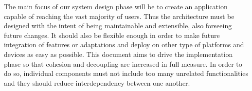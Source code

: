 The main focus of our system design phase will be to create an application capable of reaching the vast majority of users. Thus the architecture must be designed with the intent of being maintainable and extensible, also forseeing future changes.
It should also be flexible enough in order to make future integration of features or adaptations and deploy on other type of platforms and devices as easy as possible. This document aims to drive the implementation phase so that cohesion and decoupling are increased in full measure. In order to do so, individual components must not include too many unrelated functionalities and they should reduce interdependency between one another.

